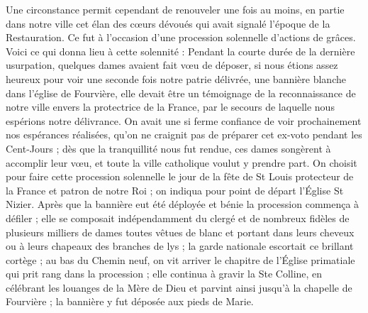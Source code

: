 \documentclass[11pt,a4paper]{report}
\begin{document}
Une circonstance permit cependant de renouveler une fois au moins, en partie dans notre ville cet élan des cœurs dévoués qui avait signalé l'époque de la Restauration. Ce fut à l'occasion d'une procession solennelle d'actions de grâces. Voici ce qui donna lieu à cette solennité : Pendant la courte durée de la dernière usurpation, quelques dames avaient fait vœu de déposer, si nous étions assez heureux pour voir une seconde fois notre patrie délivrée, une bannière blanche dans l'église de Fourvière, elle devait être un témoignage de la reconnaissance de notre ville envers la protectrice de la France, par le secours de laquelle nous espérions notre délivrance. On avait une si ferme confiance de voir prochainement nos espérances réalisées, qu'on ne craignit pas de préparer cet ex-voto pendant les Cent-Jours ; dès que la tranquillité nous fut rendue, ces dames songèrent à accomplir leur vœu, et toute la ville catholique voulut y prendre part. On choisit pour faire cette procession solennelle le jour de la fête de St Louis protecteur de la France et patron de notre Roi ; on indiqua pour point de départ l'Église St Nizier. Après que la bannière eut été déployée et bénie la procession commença à défiler ; elle se composait indépendamment du clergé et de nombreux fidèles de plusieurs milliers de dames toutes vêtues de blanc et portant dans leurs cheveux ou à leurs chapeaux des branches de lys ; la garde nationale escortait ce brillant cortège ; au bas du Chemin neuf, on vit arriver le chapitre de l'Église primatiale qui prit rang dans la procession ; elle continua à gravir la Ste Colline, en célébrant les louanges de la Mère de Dieu et parvint ainsi jusqu'à la chapelle de Fourvière ; la bannière y fut déposée aux pieds de Marie.
\end{document}
